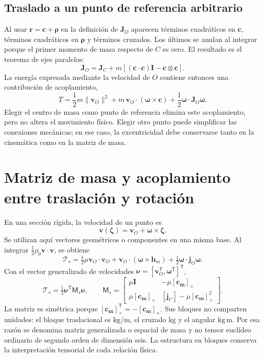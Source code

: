 \documentclass[11pt,a4paper,oneside]{report}
\newcommand{\vct}[1]{\bm{#1}}
\newcommand{\ten}[1]{\boldsymbol{#1}}
\newcommand{\Id}{\mathbf I}
\newcommand{\tr}{\mathsf T}
\newcommand{\sk}[1]{[\bm{#1}]_{\times}}
\begin{document}
\subsection{Traslado a un punto de referencia arbitrario}
Al usar $\vct r=\vct c+\vct\rho$ en la definición de $\ten J_O$ aparecen términos cuadráticos en $\vct c$, términos cuadráticos en $\vct\rho$ y términos cruzados. Los últimos se anulan al integrar porque el primer momento de masa respecto de $C$ es cero. El resultado es el teorema de ejes paralelos:
\begin{equation}
 \ten J_O=\ten J_C+
 m\left[(\vct c\cdot\vct c)\Id-\vct c\otimes\vct c\right].
 \label{eq:Steiner-volumen}
\end{equation}
La energía expresada mediante la velocidad de $O$ contiene entonces una contribución de acoplamiento,
\begin{equation}
 T=\frac12m\|\vct v_O\|^2+
 m\,\vct v_O\cdot(\vct\omega\times\vct c)
 +\frac12\vct\omega\cdot\ten J_O\vct\omega.
 \label{eq:T-origen}
\end{equation}
Elegir el centro de masa como punto de referencia elimina este acoplamiento, pero no altera el movimiento físico. Elegir otro punto puede simplificar las conexiones mecánicas; en ese caso, la excentricidad debe conservarse tanto en la cinemática como en la matriz de masa.

\section{Matriz de masa y acoplamiento entre traslación y rotación}
En una sección rígida, la velocidad de un punto es
\begin{equation}
 \vct v(\vct\zeta)=\vct v_O+\vct\omega\times\vct\zeta.
\end{equation}
Se utilizan aquí vectores geométricos o componentes en una misma base. Al integrar $\frac12\rho_0\vct v\cdot\vct v$, se obtiene
\begin{equation}
 \mathcal T_s=\tfrac12\mu\vct v_O\cdot\vct v_O
 +\vct v_O\cdot(\vct\omega\times\vct h_m)
 +\tfrac12\vct\omega\cdot\ten j_O\vct\omega.
\end{equation}
Con el vector generalizado de velocidades $\vct\nu=[\vct v_O^\tr,\vct\omega^\tr]^\tr$,
\begin{equation}
 \mathcal T_s=\tfrac12\vct\nu^\tr\mathsf M_s\vct\nu,\qquad
 \mathsf M_s=
 \begin{bmatrix}
 \mu\Id&-\mu\sk{c_m}\\
 \mu\sk{c_m}&[\ten j_C]-\mu\sk{c_m}^{2}
 \end{bmatrix}.
 \label{eq:mass6}
\end{equation}
La matriz es simétrica porque $\sk{c_m}^\tr=-\sk{c_m}$. Sus bloques no comparten unidades: el bloque traslacional es $\mathrm{kg/m}$, el cruzado $\mathrm{kg}$ y el angular $\mathrm{kg\,m}$. Por esa razón se denomina matriz generalizada o espacial de masa y no tensor euclídeo ordinario de segundo orden de dimensión seis. La estructura en bloques conserva la interpretación tensorial de cada relación física.
\end{document}
